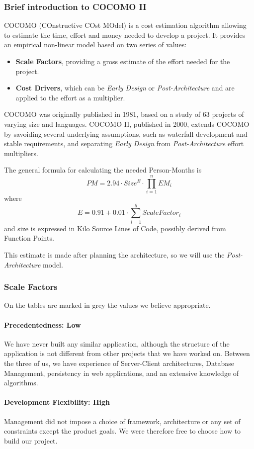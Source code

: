 \subsubsection{Brief introduction to COCOMO II}
COCOMO (COnstructive COst MOdel) is a cost estimation algorithm allowing to estimate the time, effort and money needed to develop a project. It provides an empirical non-linear model based on two series of values:
\begin{itemize}
	\item\textbf{Scale Factors}, providing a gross estimate of the effort needed for the project.
	\item\textbf{Cost Drivers}, which can be \textit{Early Design} or \textit{Post-Architecture} and are applied to the effort as a multiplier.
\end{itemize}
COCOMO was originally published in 1981, based on a study of 63 projects of varying size and languages. COCOMO II, published in 2000, extends COCOMO by savoiding several underlying assumptions, such as waterfall development and stable requirements, and separating \textit{Early Design} from \textit{Post-Architecture} effort multipliers.

The general formula for calculating the needed Person-Months is $$ PM = 2.94 \cdot Size^E \cdot \prod_{i=1}^{n} EM_i $$ where $$ E = 0.91 + 0.01 \cdot \sum_{i=1}^{5}ScaleFactor_i $$ and size is expressed in Kilo Source Lines of Code, possibly derived from Function Points.

This estimate is made after planning the architecture, so we will use the \textit{Post-Architecture} model.

\subsubsection{Scale Factors}
On the tables are marked in grey the values we believe appropriate.
\paragraph*{Precedentedness: Low}
We have never built any similar application, although the structure of the application is not different from other projects that we have worked on. Between the three of us, we have experience of Server-Client architectures, Database Management, persistency in web applications, and an extensive knowledge of algorithms.

\paragraph*{Development Flexibility: High}
Management did not impose a choice of framework, architecture or any set of constraints except the product goals. We were therefore free to choose how to build our project.

